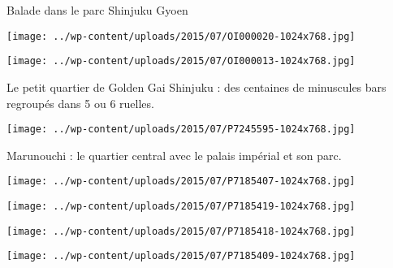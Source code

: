  

 Balade dans le parc Shinjuku Gyoen 

 

\begin{center} \texttt{[image: ../wp-content/uploads/2015/07/OI000020-1024x768.jpg]} \end{center}

 

 

\begin{center} \texttt{[image: ../wp-content/uploads/2015/07/OI000013-1024x768.jpg]} \end{center}

 

 Le petit quartier de Golden Gai Shinjuku : des centaines de minuscules bars regroupés dans 5 ou 6 ruelles. 

 

\begin{center} \texttt{[image: ../wp-content/uploads/2015/07/P7245595-1024x768.jpg]} \end{center}

 

 Marunouchi : le quartier central avec le palais impérial et son parc. 

 

\begin{center} \texttt{[image: ../wp-content/uploads/2015/07/P7185407-1024x768.jpg]} \end{center}

 

 

\begin{center} \texttt{[image: ../wp-content/uploads/2015/07/P7185419-1024x768.jpg]} \end{center}

 

 

\begin{center} \texttt{[image: ../wp-content/uploads/2015/07/P7185418-1024x768.jpg]} \end{center}

 

 

\begin{center} \texttt{[image: ../wp-content/uploads/2015/07/P7185409-1024x768.jpg]} \end{center}

 

